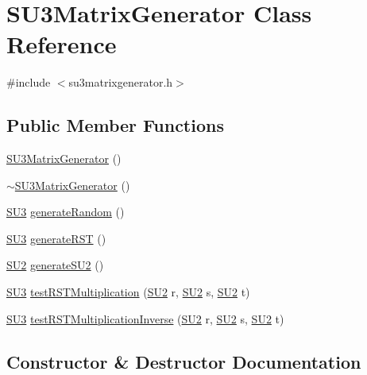 \hypertarget{class_s_u3_matrix_generator}{}\section{S\+U3\+Matrix\+Generator Class Reference}
\label{class_s_u3_matrix_generator}


{\ttfamily \#include $<$su3matrixgenerator.\+h$>$}

\subsection*{Public Member Functions}
\begin{DoxyCompactItemize}
\item 
\mbox{\hyperlink{class_s_u3_matrix_generator_ae76a62a4ba6af03901a0cc8e8632e856}{S\+U3\+Matrix\+Generator}} ()
\item 
\mbox{\hyperlink{class_s_u3_matrix_generator_a58195e1974eed39db617eaea50778f47}{$\sim$\+S\+U3\+Matrix\+Generator}} ()
\item 
\mbox{\hyperlink{class_s_u3}{S\+U3}} \mbox{\hyperlink{class_s_u3_matrix_generator_a06dc59b5a86ba6863b848ef1ca26629a}{generate\+Random}} ()
\item 
\mbox{\hyperlink{class_s_u3}{S\+U3}} \mbox{\hyperlink{class_s_u3_matrix_generator_a478a6d34a643f4ee30bc333ca1023b00}{generate\+R\+ST}} ()
\item 
\mbox{\hyperlink{class_s_u2}{S\+U2}} \mbox{\hyperlink{class_s_u3_matrix_generator_aa4e04caff654a1df7c43280b85f359bc}{generate\+S\+U2}} ()
\item 
\mbox{\hyperlink{class_s_u3}{S\+U3}} \mbox{\hyperlink{class_s_u3_matrix_generator_a05a57d1d429dc2c31d79ccf2de5efeee}{test\+R\+S\+T\+Multiplication}} (\mbox{\hyperlink{class_s_u2}{S\+U2}} r, \mbox{\hyperlink{class_s_u2}{S\+U2}} s, \mbox{\hyperlink{class_s_u2}{S\+U2}} t)
\item 
\mbox{\hyperlink{class_s_u3}{S\+U3}} \mbox{\hyperlink{class_s_u3_matrix_generator_a725f8c7882366bda7316a92c82cf4680}{test\+R\+S\+T\+Multiplication\+Inverse}} (\mbox{\hyperlink{class_s_u2}{S\+U2}} r, \mbox{\hyperlink{class_s_u2}{S\+U2}} s, \mbox{\hyperlink{class_s_u2}{S\+U2}} t)
\end{DoxyCompactItemize}


\subsection{Constructor \& Destructor Documentation}
\mbox{\label{class_s_u3_matrix_generator_ae76a62a4ba6af03901a0cc8e8632e856}} 
